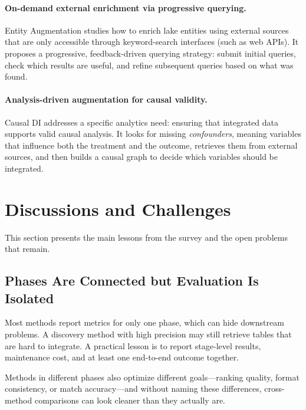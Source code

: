 \documentclass[sigconf]{acmart}
\begin{document}
\paragraph{On-demand external enrichment via progressive querying.}
Entity Augmentation studies how to enrich lake entities using external sources that are only accessible through keyword-search interfaces (such as web APIs). It proposes a progressive, feedback-driven querying strategy: submit initial queries, check which results are useful, and refine subsequent queries based on what was found.

\paragraph{Analysis-driven augmentation for causal validity.}
Causal DI addresses a specific analytics need: ensuring that integrated data supports valid causal analysis. It looks for missing \emph{confounders}, meaning variables that influence both the treatment and the outcome, retrieves them from external sources, and then builds a causal graph to decide which variables should be integrated.


\label{sec:pubs-by-phase}


\section{Discussions and Challenges}
\label{sec:discussion-challenges}

This section presents the main lessons from the survey and the open problems that remain.

\subsection{Phases Are Connected but Evaluation Is Isolated}
Most methods report metrics for only one phase, which can hide downstream problems. A discovery method with high precision may still retrieve tables that are hard to integrate. A practical lesson is to report stage-level results, maintenance cost, and at least one end-to-end outcome together.

Methods in different phases also optimize different goals---ranking quality, format consistency, or match accuracy---and without naming these differences, cross-method comparisons can look cleaner than they actually are.
\end{document}
